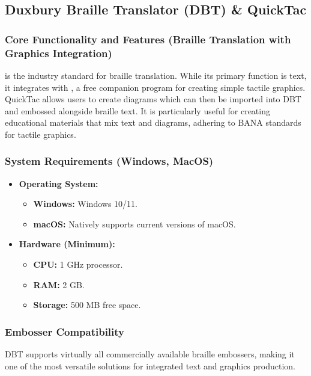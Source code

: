 \subsection{Duxbury Braille Translator (DBT) \& QuickTac}\label{ch14:ssec:dbt-quicktac}
\subsubsection{Core Functionality and Features (Braille Translation with Graphics Integration)}\label{ch14:sssec:dbt-features}
 is the industry standard for braille translation. While its primary function is text, it integrates with , a free companion program for creating simple tactile graphics. QuickTac allows users to create diagrams which can then be imported into DBT and embossed alongside braille text. It is particularly useful for creating educational materials that mix text and diagrams, adhering to BANA standards for tactile graphics.

\subsubsection{System Requirements (Windows, MacOS)}\label{ch14:sssec:dbt-sysreq}
\begin{itemize}
	\item \textbf{Operating System:}
	      \begin{itemize}
		      \item \textbf{Windows:} Windows 10/11.
		      \item \textbf{macOS:} Natively supports current versions of macOS.
	      \end{itemize}
	\item \textbf{Hardware (Minimum):}
	      \begin{itemize}
		      \item \textbf{CPU:} 1 GHz processor.
		      \item \textbf{RAM:} 2 GB.
		      \item \textbf{Storage:} 500 MB free space.
	      \end{itemize}
\end{itemize}

\subsubsection{Embosser Compatibility}\label{ch14:sssec:dbt-compat}
DBT supports virtually all commercially available braille embossers, making it one of the most versatile solutions for integrated text and graphics production.

